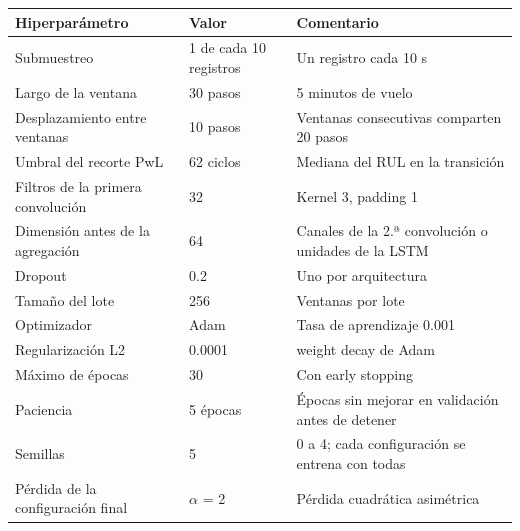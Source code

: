 \begin{tabular}{p{4.2cm}lp{5.4cm}}
\toprule
\textbf{Hiperparámetro} & \textbf{Valor} & \textbf{Comentario} \\
\midrule
Submuestreo & 1 de cada 10 registros & Un registro cada 10 s \\
Largo de la ventana & 30 pasos & 5 minutos de vuelo \\
Desplazamiento entre ventanas & 10 pasos & Ventanas consecutivas comparten 20 pasos \\
Umbral del recorte PwL & 62 ciclos & Mediana del RUL en la transición \\
Filtros de la primera convolución & 32 & Kernel 3, padding 1 \\
Dimensión antes de la agregación & 64 & Canales de la 2.ª convolución o unidades de la LSTM \\
Dropout & 0.2 & Uno por arquitectura \\
Tamaño del lote & 256 & Ventanas por lote \\
Optimizador & Adam & Tasa de aprendizaje 0.001 \\
Regularización L2 & 0.0001 & weight decay de Adam \\
Máximo de épocas & 30 & Con early stopping \\
Paciencia & 5 épocas & Épocas sin mejorar en validación antes de detener \\
Semillas & 5 & 0 a 4; cada configuración se entrena con todas \\
Pérdida de la configuración final & $\alpha$ = 2 & Pérdida cuadrática asimétrica \\
\bottomrule
\end{tabular}
